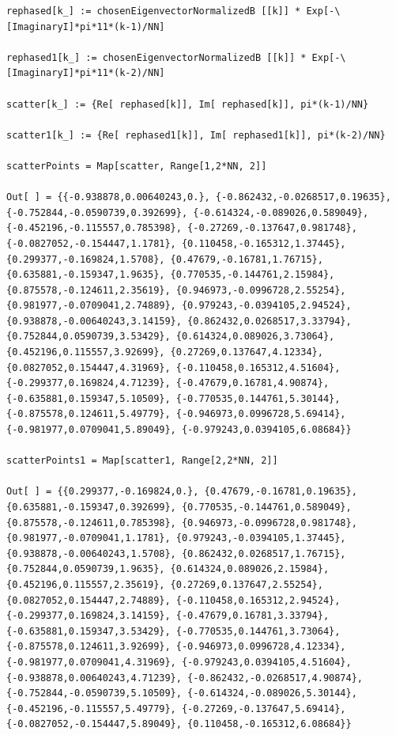 \begin{Verbatim}
rephased[k_] := chosenEigenvectorNormalizedB [[k]] * Exp[-\[ImaginaryI]*pi*11*(k-1)/NN]

rephased1[k_] := chosenEigenvectorNormalizedB [[k]] * Exp[-\[ImaginaryI]*pi*11*(k-2)/NN]

scatter[k_] := {Re[ rephased[k]], Im[ rephased[k]], pi*(k-1)/NN}

scatter1[k_] := {Re[ rephased1[k]], Im[ rephased1[k]], pi*(k-2)/NN}

scatterPoints = Map[scatter, Range[1,2*NN, 2]]

Out[ ] = {{-0.938878,0.00640243,0.}, {-0.862432,-0.0268517,0.19635}, {-0.752844,-0.0590739,0.392699}, {-0.614324,-0.089026,0.589049}, {-0.452196,-0.115557,0.785398}, {-0.27269,-0.137647,0.981748}, {-0.0827052,-0.154447,1.1781}, {0.110458,-0.165312,1.37445}, {0.299377,-0.169824,1.5708}, {0.47679,-0.16781,1.76715}, {0.635881,-0.159347,1.9635}, {0.770535,-0.144761,2.15984}, {0.875578,-0.124611,2.35619}, {0.946973,-0.0996728,2.55254}, {0.981977,-0.0709041,2.74889}, {0.979243,-0.0394105,2.94524}, {0.938878,-0.00640243,3.14159}, {0.862432,0.0268517,3.33794}, {0.752844,0.0590739,3.53429}, {0.614324,0.089026,3.73064}, {0.452196,0.115557,3.92699}, {0.27269,0.137647,4.12334}, {0.0827052,0.154447,4.31969}, {-0.110458,0.165312,4.51604}, {-0.299377,0.169824,4.71239}, {-0.47679,0.16781,4.90874}, {-0.635881,0.159347,5.10509}, {-0.770535,0.144761,5.30144}, {-0.875578,0.124611,5.49779}, {-0.946973,0.0996728,5.69414}, {-0.981977,0.0709041,5.89049}, {-0.979243,0.0394105,6.08684}}

scatterPoints1 = Map[scatter1, Range[2,2*NN, 2]]

Out[ ] = {{0.299377,-0.169824,0.}, {0.47679,-0.16781,0.19635}, {0.635881,-0.159347,0.392699}, {0.770535,-0.144761,0.589049}, {0.875578,-0.124611,0.785398}, {0.946973,-0.0996728,0.981748}, {0.981977,-0.0709041,1.1781}, {0.979243,-0.0394105,1.37445}, {0.938878,-0.00640243,1.5708}, {0.862432,0.0268517,1.76715}, {0.752844,0.0590739,1.9635}, {0.614324,0.089026,2.15984}, {0.452196,0.115557,2.35619}, {0.27269,0.137647,2.55254}, {0.0827052,0.154447,2.74889}, {-0.110458,0.165312,2.94524}, {-0.299377,0.169824,3.14159}, {-0.47679,0.16781,3.33794}, {-0.635881,0.159347,3.53429}, {-0.770535,0.144761,3.73064}, {-0.875578,0.124611,3.92699}, {-0.946973,0.0996728,4.12334}, {-0.981977,0.0709041,4.31969}, {-0.979243,0.0394105,4.51604}, {-0.938878,0.00640243,4.71239}, {-0.862432,-0.0268517,4.90874}, {-0.752844,-0.0590739,5.10509}, {-0.614324,-0.089026,5.30144}, {-0.452196,-0.115557,5.49779}, {-0.27269,-0.137647,5.69414}, {-0.0827052,-0.154447,5.89049}, {0.110458,-0.165312,6.08684}}
\end{Verbatim}

